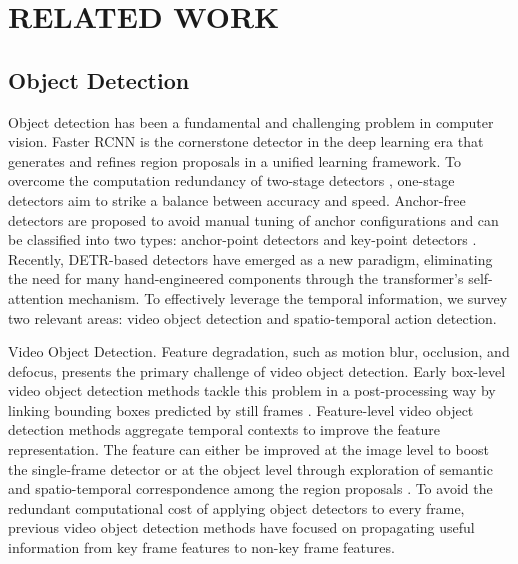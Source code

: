 \section{RELATED WORK}
\subsection{Object Detection }
Object detection has been a fundamental and challenging
problem in computer vision. Faster RCNN \cite{ren2015faster} is the cornerstone detector in the deep learning era that generates and refines region proposals in a unified learning framework. To overcome the computation redundancy of two-stage detectors \cite{cai2018cascade,ren2015faster}, one-stage detectors \cite{redmon2018yolov3,dai2016r,lin2017focal} aim to strike a balance between accuracy and speed. Anchor-free detectors are proposed to avoid manual tuning of anchor configurations and can be classified into two types: anchor-point detectors \cite{tian2019fcos,zhang2020bridging} and key-point detectors \cite{zhou2019objects,dong2020centripetalnet}. Recently, DETR-based detectors \cite{carion2020end, zhu2020deformable, zhang2022dino} have emerged as a new paradigm,  eliminating the need for many hand-engineered components through the transformer's self-attention mechanism. To effectively leverage the temporal information, we survey two relevant areas: video object detection and spatio-temporal action detection.

Video Object Detection. Feature degradation, such as motion blur, occlusion, and defocus, presents the primary challenge of video object detection. Early box-level video object detection methods tackle this problem in a post-processing way by linking bounding boxes predicted by still frames \cite{kang2017t, han2016seq, feichtenhofer2017detect, chen2018optimizing}. Feature-level video object detection methods aggregate temporal contexts to improve the feature representation. The feature can either be improved at the image level to boost the single-frame detector \cite{bertasius2018object, xiao2018video, zhu2017flow, zhu2018towards,zhu2017deep} or at the object level through exploration of semantic and spatio-temporal correspondence among the region proposals \cite{wu2019sequence, deng2019relation, shvets2019leveraging, yao2020video, han2020mining, deng2019object, gong2021temporal,wang2018fully}.  To avoid the redundant computational cost of applying object detectors to every frame, previous video object detection methods have focused on propagating useful information from key frame features to non-key frame features. 


